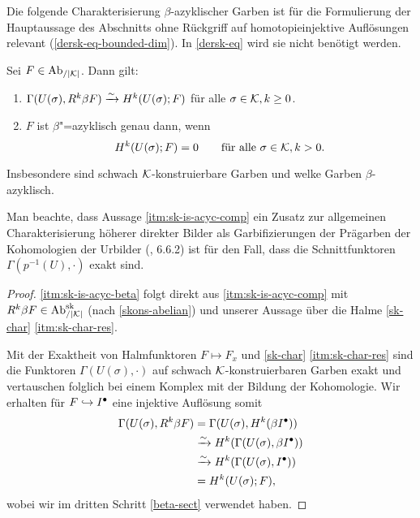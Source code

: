 Die folgende Charakterisierung $\beta$-azyklischer Garben ist für die
Formulierung der Hauptaussage des Abschnitts ohne Rückgriff auf
homotopieinjektive Auflösungen relevant
(\ref{dersk-eq-bounded-dim}). In \ref{dersk-eq} wird sie nicht
benötigt werden.
\begin{prop}[\cite{KS}, 8.1.8] \label{sk-is-acyc}
  Sei $F \in \operatorname{Ab}_{/|\mathcal{K}|}$. Dann gilt:
  \begin{enumerate}[label=(\roman*)]
  \item \label{itm:sk-is-acyc-comp} $\Gamma(U(\sigma), R^k\beta F)
    \xrightarrow[]{\sim} H^k(U(\sigma); F)$ für alle $\sigma \in \mathcal{K}, k \geq 0$.
  \item \label{itm:sk-is-acyc-beta} $F$ ist $\beta$"=azyklisch genau dann,
    wenn
    \[ H^k(U(\sigma); F) = 0 \qquad \text{für alle } \sigma \in \mathcal{K}, k > 0 . \]
  \end{enumerate}
  Insbesondere sind schwach $\mathcal{K}$-konstruierbare Garben und welke
  Garben $\beta$-azyklisch.
\end{prop}
\begin{bem}
  Man beachte, dass Aussage \ref{itm:sk-is-acyc-comp} ein Zusatz zur
  allgemeinen Charakterisierung höherer direkter Bilder als
  Garbifizierungen der Prägarben der Kohomologien der Urbilder
  (\cite{TG}, 6.6.2) ist für den Fall, dass die Schnittfunktoren
  $\Gamma(p^{-1}(U), \cdot)$ exakt sind.
\end{bem}
\begin{proof}
  \ref{itm:sk-is-acyc-beta} folgt direkt aus \ref{itm:sk-is-acyc-comp}
  mit $R^k\beta F \in \operatorname{Ab}_{/|\mathcal{K}|}^{\operatorname{sk}}$ (nach \ref{skons-abelian}) und unserer
  Aussage über die Halme \ref{sk-char} \ref{itm:sk-char-res}.
  
  Mit der Exaktheit von Halmfunktoren $F \mapsto F_x$ und
  \ref{sk-char} \ref{itm:sk-char-res} sind die Funktoren
  $\Gamma(U(\sigma), \cdot)$ auf schwach $\mathcal{K}$-konstruierbaren Garben
  exakt und vertauschen folglich bei einem Komplex mit der Bildung der
  Kohomologie. Wir erhalten für $F \hookrightarrow I^{\bullet}$ eine injektive Auflösung
  somit
  \begin{align*}
    \Gamma(U(\sigma), R^k\beta F)
    &= \Gamma(U(\sigma), H^k(\beta I^{\bullet})) \\
    &\xrightarrow[]{\sim} H^k(\Gamma(U(\sigma), \beta I^{\bullet})) \\
    &\xrightarrow[]{\sim} H^k(\Gamma(U(\sigma), I^{\bullet})) \\
    &= H^k(U(\sigma); F),
  \end{align*}
  wobei wir im dritten Schritt \ref{beta-sect} verwendet haben.
\end{proof}

